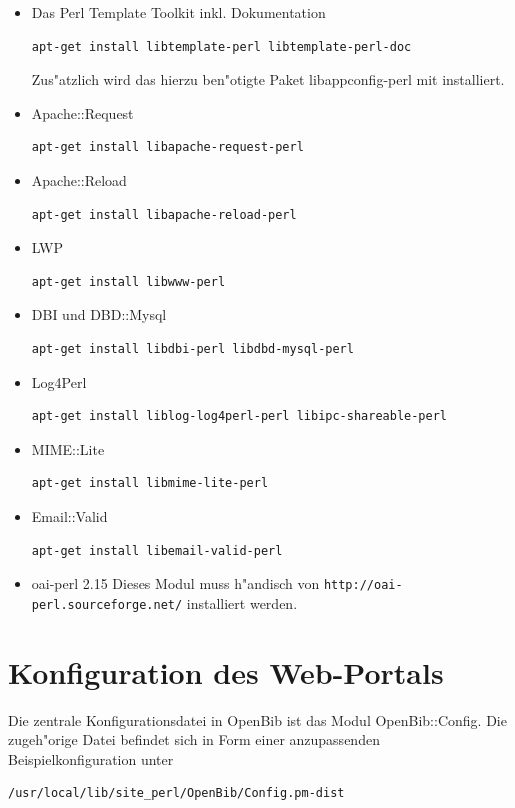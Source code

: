 \documentclass[11pt, twoside, a4paper, BCOR8mm, DIV12, bibtotoc,idxtotoc]{scrbook}
\begin{document}
\begin{itemize}
\item Das Perl Template Toolkit inkl. Dokumentation
\begin{verbatim}
apt-get install libtemplate-perl libtemplate-perl-doc
\end{verbatim}
  Zus"atzlich wird das hierzu ben"otigte Paket libappconfig-perl mit
  installiert.
\item Apache::Request
\begin{verbatim}
apt-get install libapache-request-perl
\end{verbatim}
\item Apache::Reload
\begin{verbatim}
apt-get install libapache-reload-perl
\end{verbatim}
\item LWP
\begin{verbatim}
apt-get install libwww-perl
\end{verbatim}
\item DBI und DBD::Mysql
\begin{verbatim}
apt-get install libdbi-perl libdbd-mysql-perl
\end{verbatim}
\item Log4Perl
\begin{verbatim}
apt-get install liblog-log4perl-perl libipc-shareable-perl
\end{verbatim}
\item MIME::Lite
\begin{verbatim}
apt-get install libmime-lite-perl
\end{verbatim}
\item Email::Valid
\begin{verbatim}
apt-get install libemail-valid-perl
\end{verbatim}
\item oai-perl 2.15
Dieses Modul muss h"andisch von
\texttt{http://oai-perl.sourceforge.net/} installiert werden.
\end{itemize}

\section{Konfiguration des Web-Portals}
\label{sec:confportal}

Die zentrale Konfigurationsdatei in OpenBib ist das Modul
OpenBib::Config. Die zugeh"orige Datei befindet sich in Form einer
anzupassenden Beispielkonfiguration unter 

\begin{verbatim}
/usr/local/lib/site_perl/OpenBib/Config.pm-dist
\end{verbatim}
\end{document}
